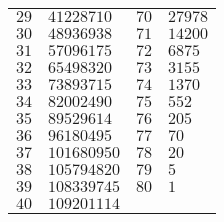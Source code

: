 \documentclass{article}
\begin{document}
\begin{minipage}{0.48\textwidth}
\begin{tabular}{c|l||c|l}
$29$ & $41228710$ & $70$ & $27978$ \\
$30$ & $48936938$ & $71$ & $14200$ \\
$31$ & $57096175$ & $72$ & $6875$ \\
$32$ & $65498320$ & $73$ & $3155$ \\
$33$ & $73893715$ & $74$ & $1370$ \\
$34$ & $82002490$ & $75$ & $552$ \\
$35$ & $89529614$ & $76$ & $205$ \\
$36$ & $96180495$ & $77$ & $70$ \\
$37$ & $101680950$ & $78$ & $20$ \\
$38$ & $105794820$ & $79$ & $5$ \\
$39$ & $108339745$ & $80$ & $1$ \\
$40$ & $109201114$ &  & 
    \end{tabular}
\end{minipage}
\end{document}
